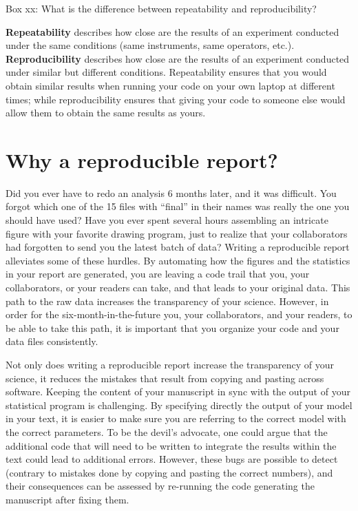 \documentclass[
]{book}
\begin{document}
Box xx: What is the difference between repeatability and reproducibility?

\textbf{Repeatability} describes how close are the results of an experiment conducted under the same conditions (same instruments, same operators, etc.). \textbf{Reproducibility} describes how close are the results of an experiment conducted under similar but different conditions. Repeatability ensures that you would obtain similar results when running your code on your own laptop at different times; while reproducibility ensures that giving your code to someone else would allow them to obtain the same results as yours.

\hypertarget{why-a-reproducible-report}{%
\section{Why a reproducible report?}\label{why-a-reproducible-report}}

Did you ever have to redo an analysis 6 months later, and it was difficult. You forgot which one of the 15 files with ``final'' in their names was really the one you should have used? Have you ever spent several hours assembling an intricate figure with your favorite drawing program, just to realize that your collaborators had forgotten to send you the latest batch of data? Writing a reproducible report alleviates some of these hurdles. By automating how the figures and the statistics in your report are generated, you are leaving a code trail that you, your collaborators, or your readers can take, and that leads to your original data. This path to the raw data increases the transparency of your science. However, in order for the six-month-in-the-future you, your collaborators, and your readers, to be able to take this path, it is important that you organize your code and your data files consistently.

Not only does writing a reproducible report increase the transparency of your science, it reduces the mistakes that result from copying and pasting across software. Keeping the content of your manuscript in sync with the output of your statistical program is challenging. By specifying directly the output of your model in your text, it is easier to make sure you are referring to the correct model with the correct parameters. To be the devil's advocate, one could argue that the additional code that will need to be written to integrate the results within the text could lead to additional errors. However, these bugs are possible to detect (contrary to mistakes done by copying and pasting the correct numbers), and their consequences can be assessed by re-running the code generating the manuscript after fixing them.
\end{document}
